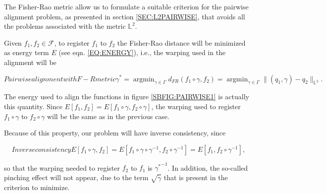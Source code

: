 
The Fisher-Rao metric allow us to formulate a suitable criterion for the
pairwise alignment problem, as presented in section \ref{SEC:L2PAIRWISE},
 that avoids all the problems associated with the metric $\mathbb{L}^2$.

Given $f_1, f_2 \in \mathscr{F}$, to register $f_1$ to $f_2$ the Fisher-Rao distance
will be minimized as energy term $E$ (see eqn. \ref{EQ:ENERGY}), i.e.,
the warping used in the alignment will be

\begin{equation}[EQ:DPAELASTIC]{Pairwise alignment with F-R metric}
\gamma^{*}= \operatorname{argmin}_{\gamma \in \Gamma} d_{FR}(f_1 \circ \gamma,
f_2) = \operatorname{argmin}_{\gamma \in \Gamma} \|
(q_1, \gamma) - q_2 \|_{\mathbb{L}^2}.
\end{equation}

The energy used to align the functions in figure \ref{SBFIG:PAIRWISE1} is
actually this quantity.
Since
$E[f_1, f_2] = E[f_1 \circ \gamma, f_2 \circ \gamma]$, the warping used to
register $f_1 \circ \gamma$ to $f_2 \circ \gamma$ will be the same as in the
previous case.

Because of this property, our problem will have inverse consistency, since

\begin{equation}[]{Inverse consistency}
E[f_1 \circ \gamma, f_2] = E[f_1 \circ \gamma \circ \gamma^{-1}, f_2
\circ \gamma^{-1}] = E[f_1, f_2 \circ \gamma^{-1}],
\end{equation}

so that the warping needed to register $f_2$ to $f_1$  is ${\gamma^*}^{-1}$.
In addition, the so-called pinching effect will not appear, due to the term
$\sqrt{\dot \gamma}$ that is present in the criterion to minimize.


